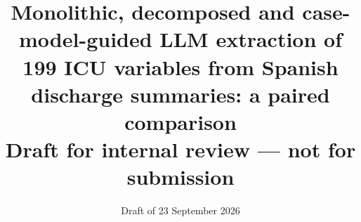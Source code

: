 \documentclass[11pt,a4paper]{article}
\title{Monolithic, decomposed and case-model-guided LLM extraction of 199 ICU variables from Spanish
discharge summaries: a paired comparison\\[0.5em]\large Draft for internal review --- not for submission}
\author{\todoauthor{author list, affiliations and corresponding author}}
\date{Draft of 23 September 2026}
\begin{document}
\maketitle













\clearpage
\appendix
\renewcommand{\thesection}{Appendix \Alph{section}}





\end{document}
